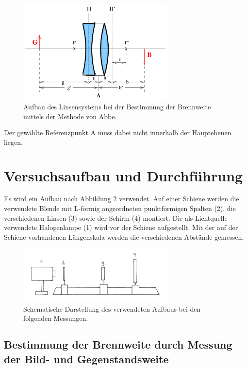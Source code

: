 \begin{figure}
  \centering
  \includegraphics[width = 0.7\textwidth]{Pics/Linsensystem.png}
  \caption{Aufbau des Linsensystems bei der Bestimmung der Brennweite mittels der
  Methode von Abbe.\cite{anleitung01}}
  \label{fig:Linsensystem}
\end{figure}

Der gewählte Referenzpunkt A muss dabei nicht innerhalb der Hauptebenen liegen.

\section{Versuchsaufbau und Durchführung}

Es wird ein Aufbau nach Abbildung \ref{fig:Aufbau} verwendet. Auf einer
Schiene werden die verwendete Blende mit L-förmig angeordneten punktförmigen
Spalten (2), die verschiedenen Linsen (3) sowie der Schirm (4) montiert. Die als
Lichtquelle verwendete Halogenlampe (1) wird vor der Schiene aufgestellt.
Mit der auf der Schiene vorhandenen Längenskala werden die verschiedenen
Abstände gemessen.

\begin{figure}
  \centering
  \includegraphics[width = 0.7\textwidth]{Pics/Aufbau.JPG}
  \caption{Schematische Darstellung des verwendeten Aufbaus bei den folgenden Messungen. \cite{anleitung01}}
  \label{fig:Aufbau}
\end{figure}

\subsection{Bestimmung der Brennweite durch Messung der Bild- und Gegenstandsweite}

